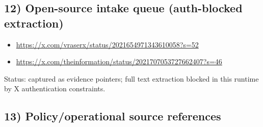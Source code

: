 \documentclass[
]{article}
\providecommand{\tightlist}{%
  \setlength{\itemsep}{0pt}\setlength{\parskip}{0pt}}
\begin{document}
\hypertarget{open-source-intake-queue-auth-blocked-extraction}{%
\subsection{12) Open-source intake queue (auth-blocked
extraction)}\label{open-source-intake-queue-auth-blocked-extraction}}

\begin{itemize}
\tightlist
\item
  \url{https://x.com/vraserx/status/2021654971343610058?s=52}
\item
  \url{https://x.com/theinformation/status/2021707053727662407?s=46}
\end{itemize}

Status: captured as evidence pointers; full text extraction blocked in
this runtime by X authentication constraints.

\hypertarget{policyoperational-source-references}{%
\subsection{13) Policy/operational source
references}\label{policyoperational-source-references}}
\end{document}
